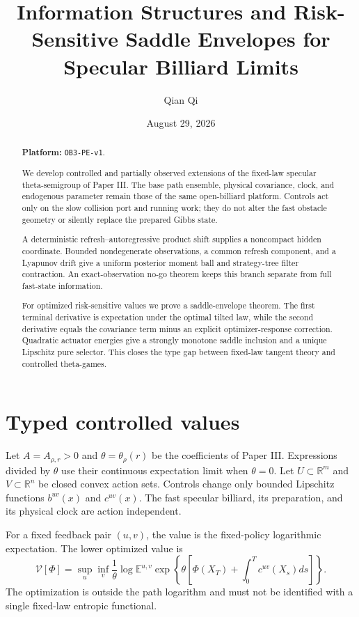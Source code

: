 \documentclass[11pt,reqno]{amsart}
\title[Information and saddle extensions]{Information Structures and Risk-Sensitive Saddle Envelopes for Specular Billiard Limits}
\author{Qian Qi}
\date{August 29, 2026}
\theoremstyle{definition}
\theoremstyle{remark}
\newcommand{\E}{\mathbb E}
\newcommand{\R}{\mathbb R}
\begin{document}
\raggedbottom
\begin{abstract}
\noindent\textbf{Platform: }\texttt{OB3-PE-v1}.\par
We develop controlled and partially observed extensions of the fixed-law
specular theta-semigroup of Paper III.  The base path ensemble, physical
covariance, clock, and endogenous parameter remain those of the same
open-billiard platform.  Controls act only on the slow collision port and
running work; they do not alter the fast obstacle geometry or silently replace
the prepared Gibbs state.

A deterministic refresh--autoregressive product shift supplies a noncompact
hidden coordinate.  Bounded nondegenerate observations, a common refresh
component, and a Lyapunov drift give a uniform posterior moment ball and
strategy-tree filter contraction.  An exact-observation no-go theorem keeps
this branch separate from full fast-state information.

For optimized risk-sensitive values we prove a saddle-envelope theorem.  The
first terminal derivative is expectation under the optimal tilted law, while
the second derivative equals the covariance term minus an explicit
optimizer-response correction.  Quadratic actuator energies give a strongly
monotone saddle inclusion and a unique Lipschitz pure selector.  This closes
the type gap between fixed-law tangent theory and controlled theta-games.
\end{abstract}
\maketitle
\tableofcontents

\section{Typed controlled values}\label{sec:types}
Let $A=A_{\rho,r}>0$ and $\theta=\theta_\rho(r)$ be the coefficients of
Paper III.  Expressions divided by $\theta$ use their continuous expectation
limit when $\theta=0$.  Let $U\subset\R^m$ and $V\subset\R^n$ be closed convex
action sets.  Controls change only bounded Lipschitz functions $b^{uv}(x)$ and
$c^{uv}(x)$.  The fast specular billiard, its preparation, and its physical
clock are action independent.

For a fixed feedback pair $(u,v)$, the value is the fixed-policy logarithmic
expectation.  The lower optimized value is
\[
 \mathcal V[\Phi]
 =\sup_u\inf_v\frac1\theta\log
 \E^{u,v}\exp\left\{\theta\left[
 \Phi(X_T)+\int_0^Tc^{uv}(X_s)ds\right]\right\}.
\]
The optimization is outside the path logarithm and must not be identified with
a single fixed-law entropic functional.
\end{document}

